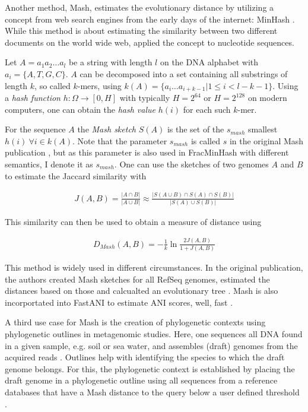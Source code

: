 Another method, Mash, estimates the evolutionary distance by utilizing a concept
from web search engines from the early days of the internet: MinHash
\cite{broderResemblanceContainmentDocuments1998a,ondovMashFastGenome2016}. While
this method is about estimating the similarity between two different documents
on the world wide web,  applied the concept
to nucleotide sequences.

Let $A = a_1 a_2 \dots a_l$ be a string with length $l$ on the DNA alphabet with
$a_i = \{A, T, G, C\}$. $A$ can be decomposed into a set containing all
substrings of length $k$, so called $k$-mers, using $k(A) = \{a_i \dots
a_{i+k-1} | 1 \leq i < l-k-1\}$. Using a \textit{hash function} $h: \Omega
\rightarrow [0, H]$ with typically $H=2^{64}$ or $H=2^{128}$ on modern
computers, one can obtain the \textit{hash value} $h(i)$ for each such $k$-mer.

For the sequence $A$ the \textit{Mash sketch} $S(A)$ is the set of the
$s_{mash}$ smallest $h(i) ~ \forall i \in k(A)$. Note that the parameter
$s_{mash}$ is called $s$ in the original Mash publication
\cite{ondovMashFastGenome2016}, but as this parameter is also used in
FracMinHash with different semantics, I denote it as $s_{mash}$. One can use the
sketches of two genomes $A$ and $B$ to estimate the Jaccard similarity with 

\begin{align}
  J(A, B) = \frac{|A \cap B|}{|A \cup B|} \approx \frac{|S(A \cup B) \cap S(A) \cap S(B)|}{|S(A) \cup S(B)|}
\end{align}

This similarity can then be used to obtain a measure of distance using

\begin{align}
  D_{Mash}(A,B) = -\frac{1}{k}\ln{\frac{2J(A,B)}{1+J(A,B)}}
\end{align}

This method is widely used in different circumstances. In the original
publication, the authors created Mash sketches for all RefSeq genomes, estimated
the distances based on those and calcualted an evolutionary tree
\cite{ondovMashFastGenome2016}. Mash is also incorportated into FastANI to
estimate ANI scores, well, fast \cite{jainHighThroughputANI2018}.

A third use case for Mash is the creation of phylogenetic contexts using
phylogenetic outlines \cite{bagciMicrobialPhylogeneticContext2021} in
metagenomic studies. Here, one sequences all DNA found in a given sample, e.g.
soil or sea water, and assembles (draft) genomes from the acquired reads
\cite{kuninBioinformaticianGuideMetagenomics2008}. Outlines help with
identifying the species to which the draft genome belongs. For this, the
phylogenetic context is established by placing the draft genome in a
phylogenetic outline using all sequences from a reference databases that have a
Mash distance to the query below a user defined threshold
\cite{bagciMicrobialPhylogeneticContext2021}.

